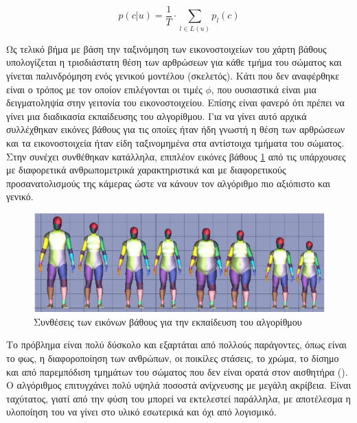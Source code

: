 \begin{equation}
    p(c|u) = \frac{1}{T} \cdot \sum_{l \in L(u)} p_{l}(c)
    \label{equ:kinect-algorithm-pixel-probability}
\end{equation}

Ως τελικό βήμα με βάση την ταξινόμηση των εικονοστοιχείων του χάρτη βάθους υπολογίζεται η τρισδιάστατη θέση των αρθρώσεων για κάθε τμήμα του σώματος και γίνεται παλινδρόμηση ενός γενικού μοντέλου (σκελετός). Κάτι που δεν αναφέρθηκε είναι ο τρόπος με τον οποίον επιλέγονται οι τιμές $\phi$, που ουσιαστικά είναι μια δειγματοληψία στην γειτονία του εικονοστοιχείου. Επίσης είναι φανερό ότι πρέπει να γίνει μια διαδικασία εκπαίδευσης του αλγορίθμου. Για να γίνει αυτό αρχικά συλλέχθηκαν εικόνες βάθους για τις οποίες ήταν ήδη γνωστή η θέση των αρθρώσεων και τα εικονοστοιχεία ήταν είδη ταξινομημένα στα αντίστοιχα τμήματα του σώματος. Στην συνέχει συνθέθηκαν κατάλληλα, επιπλέον εικόνες βάθους \ref{fig:kinect-data-synthesis} από τις υπάρχουσες με διαφορετικά ανθρωπομετρικά χαρακτηριστικά και με διαφορετικούς προσανατολισμούς της κάμερας ώστε να κάνουν τον αλγόριθμο πιο αξιόπιστο και γενικό.

\begin{figure}[H]
    \centering
    \includegraphics[width=.8\textwidth, keepaspectratio]{fig/kinect-data-synthesis.png}
    \caption{Συνθέσεις των εικόνων βάθους για την εκπαίδευση του αλγορίθμου \cite{shotton11}}
    \label{fig:kinect-data-synthesis}
\end{figure}

Το πρόβλημα είναι πολύ δύσκολο και εξαρτάται από πολλούς παράγοντες, όπως είναι το φως, η διαφοροποίηση των ανθρώπων, οι ποικίλες στάσεις, το χρώμα, το δίσημο και από παρεμπόδιση τμημάτων του σώματος που δεν είναι ορατά στον αισθητήρα (). Ο αλγόριθμος επιτυγχάνει πολύ υψηλά ποσοστά ανίχνευσης με μεγάλη ακρίβεια. Είναι ταχύτατος, γιατί από την φύση του μπορεί να εκτελεστεί παράλληλα, με αποτέλεσμα η υλοποίηση του να γίνει στο υλικό εσωτερικά και όχι από λογισμικό.

